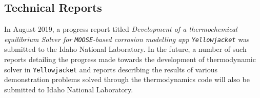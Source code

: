 	\subsection{Technical Reports}
	In August 2019, a progress report titled \emph{Development of a thermochemical equilibrium Solver for \texttt{MOOSE}-based corrosion modelling app  \texttt{Yellowjacket}} was submitted to the Idaho National Laboratory. In the future, a number of such reports detailing the progress made towards the development of thermodynamic solver in \texttt{Yellowjacket} and reports describing the results of various demonstration problems solved through the thermodynamics code will also be submitted to Idaho National Laboratory.
